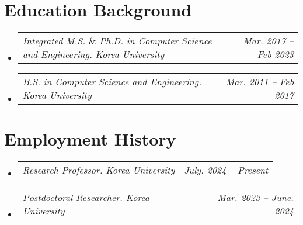 \documentclass[letterpaper,11pt]{article}
\makeatletter
\newcommand{\resumeSubheadingTwo}[2]{
  \vspace{-2pt}\item
    \begin{tabular*}{1.0\textwidth}[t]{l@{\extracolsep{\fill}}r}
      \textit{#1} & \textit{#2} \\
    \end{tabular*}\vspace{-7pt}
}
\newcommand{\resumeSubheading}[4]{
  \vspace{-2pt}\item
    \begin{tabular*}{1.0\textwidth}[t]{l@{\extracolsep{\fill}}r}
      \textbf{#1} & \textbf{\small #2} \\
      \textit{\small#3} & \textit{\small #4} \\
    \end{tabular*}\vspace{-7pt}
}
\newcommand{\resumeSubHeadingListStart}{\begin{itemize}[leftmargin=0.0in, label={}]}
\newcommand{\resumeSubHeadingListEnd}{\end{itemize}}
\makeatother
\begin{document}






\section{Education Background}
  \resumeSubHeadingListStart
  \resumeSubheadingTwo
      {Integrated M.S. $\&$ Ph.D. in Computer Science and Engineering. Korea University}{Mar. 2017 -- Feb 2023}\vspace{-12pt}
      \resumeSubheadingTwo
      {B.S. in Computer Science and Engineering. Korea University}{Mar. 2011 -- Feb 2017}      
  \resumeSubHeadingListEnd


\section{Employment History}
\resumeSubHeadingListStart
    \resumeSubheadingTwo
    {Research Professor. Korea University}{July. 2024 -- Present}\vspace{-10pt}  
    \resumeSubheadingTwo
    {Postdoctoral Researcher. Korea University}{Mar. 2023 -- June. 2024}\vspace{-15pt}  
\resumeSubHeadingListEnd
\end{document}
